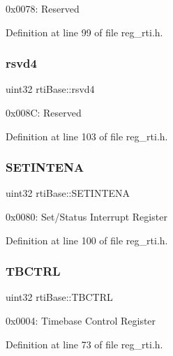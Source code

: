 0x0078\+: Reserved 

Definition at line 99 of file reg\+\_\+rti.\+h.

\mbox{\label{structrtiBase_a91816f7cc831099bd0b6158e963d94a4}} 
\subsubsection{\texorpdfstring{rsvd4}{rsvd4}}
{\footnotesize\ttfamily uint32 rti\+Base\+::rsvd4}

0x008C\+: Reserved 

Definition at line 103 of file reg\+\_\+rti.\+h.

\mbox{\label{structrtiBase_a738dafad4f6f42b771207ab191578c88}} 
\subsubsection{\texorpdfstring{S\+E\+T\+I\+N\+T\+E\+NA}{SETINTENA}}
{\footnotesize\ttfamily uint32 rti\+Base\+::\+S\+E\+T\+I\+N\+T\+E\+NA}

0x0080\+: Set/\+Status Interrupt Register 

Definition at line 100 of file reg\+\_\+rti.\+h.

\mbox{\label{structrtiBase_a7a125b3f6937e55a69af4b73e417d30b}} 
\subsubsection{\texorpdfstring{T\+B\+C\+T\+RL}{TBCTRL}}
{\footnotesize\ttfamily uint32 rti\+Base\+::\+T\+B\+C\+T\+RL}

0x0004\+: Timebase Control Register 

Definition at line 73 of file reg\+\_\+rti.\+h.

\mbox{\label{structrtiBase_a9e2cefa71a792950240cd24e8bf0fd2d}} 
